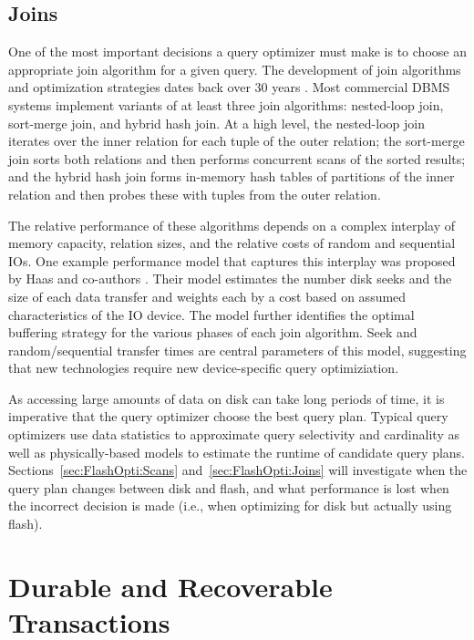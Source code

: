 \subsection{Joins}
\label{sec:Background:Joins}

One of the most important decisions a query optimizer must make is to choose an appropriate join algorithm for a given query.
The development of join algorithms and optimization strategies dates back over 30 years \cite{Selinger1979,Shapiro1986}. 
Most commercial DBMS systems implement variants of at least three join algorithms: nested-loop join, sort-merge join, and hybrid hash join.
At a high level, the nested-loop join iterates over the inner relation for each tuple of the outer relation; the sort-merge join sorts both relations and then performs concurrent scans of the sorted results; and the hybrid hash join forms in-memory hash tables of partitions of the inner relation and then probes these with tuples from the outer relation.

The relative performance of these algorithms depends on a complex interplay of memory capacity, relation sizes, and the relative costs of random and sequential IOs.  
One example performance model that captures this interplay was proposed by Haas and co-authors \cite{DBLP:journals/vldb/HaasCLS97}.
Their model estimates the number disk seeks and the size of each data transfer and weights each by a cost based on assumed characteristics of the IO device.
The model further identifies the optimal buffering strategy for the various phases of each join algorithm.
Seek and random/sequential transfer times are central parameters of this model, suggesting that new technologies require new device-specific query optimiziation.

As accessing large amounts of data on disk can take long periods of time, it is imperative that the query optimizer choose the best query plan.
Typical query optimizers use data statistics to approximate query selectivity and cardinality as well as physically-based models to estimate the runtime of candidate query plans.
Sections~\ref{sec:FlashOpti:Scans} and~\ref{sec:FlashOpti:Joins} will investigate when the query plan changes between disk and flash, and what performance is lost when the incorrect decision is made (i.e., when optimizing for disk but actually using flash).

\section{Durable and Recoverable Transactions}
\label{sec:Background:Recovery}

